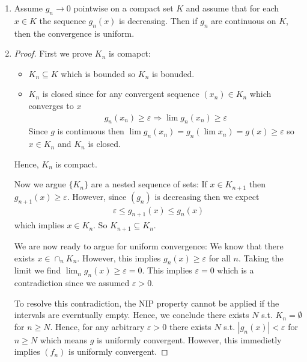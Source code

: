 \begin{enumerate}[label=(\alph*)]
    \item 
    Assume $g_n \rightarrow 0$ pointwise
    on a compact set $K$ and assume that for each $x\in K$ the sequence $g_n(x)$
    is decreasing. Then if $g_n$ are continuous on $K$,
    then the convergence is uniform.

    \item
    \begin{proof}
        First we prove $K_n$ is comapct:
        \begin{itemize}
            \item $K_n\subseteq K$ which is bounded so $K_n$ is bonuded.
            \item $K_n$ is closed since for any convergent sequence $(x_n)\in K_n$
            which converges to $x$
            \begin{align*}
                g_n(x_n)\geq \varepsilon \Rightarrow \lim g_n(x_n) \geq \varepsilon
            \end{align*}
            Since $g$ is continuous then $ \lim g_n(x_n) = g_n(\lim x_n)=g(x)\geq \varepsilon$
            so $x\in K_n$ and $K_n$ is closed.
        \end{itemize}
        Hence, $K_n$ is compact.

        Now we argue $\{K_n\}$ are a nested sequence of sets:
        If $x\in K_{n+1}$ then $g_{n+1}(x)\geq \varepsilon$. However, since $(g_n)$
        is decreasing then we expect
        \begin{align*}
            \varepsilon \leq g_{n+1}(x) \leq g_n(x)
        \end{align*}
        which implies $x\in K_n$. So $K_{n+1} \subseteq K_n$.

        We are now ready to argue for uniform convergence:
        We know that there exists $x\in \cap_n K_n$. However, this implies $g_n(x)\geq \varepsilon$
        for all $n$. Taking the limit we find $\lim_n g_n(x)\geq \varepsilon = 0$.
        This implies $\varepsilon=0$ which is a contradiction since we assumed $\varepsilon>0$.

        To resolve this contradiction, the NIP property cannot be applied if the intervals
        are everntually empty. Hence, we conclude there exists $N$ s.t. $K_n=\emptyset$
        for $n\geq N$. Hence, for any arbitrary $\varepsilon>0$ there exists $N$
        s.t. $|g_n(x)| < \varepsilon$ for $n\geq N$ which means $g$ is uniformly convergent.
        However, this immedietly implies $(f_n)$ is uniformly convergent.
    \end{proof}
\end{enumerate}

